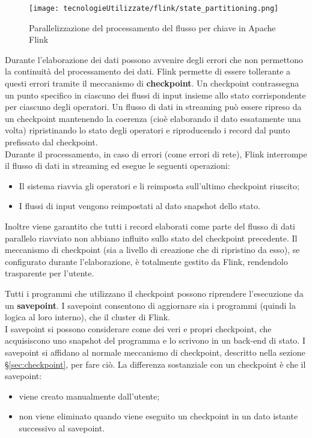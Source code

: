 \begin{figure}[H] 
    \centering 
    \texttt{[image: tecnologieUtilizzate/flink/state\_partitioning.png]} 
    \caption{Parallelizzazione del processamento del flusso per chiave in Apache Flink}
\end{figure}

\label{sec:checkpoint}
Durante l'elaborazione dei dati possono avvenire degli errori che non permettono la continuità del processamento dei dati. Flink permette di essere tollerante a questi errori tramite il meccanismo di \textbf{checkpoint}. Un checkpoint contrassegna un punto specifico in ciascuno dei flussi di input insieme allo stato corrispondente per ciascuno degli operatori. Un flusso di dati in streaming può essere ripreso da un checkpoint mantenendo la coerenza (cioè elaborando il dato essatamente una volta) ripristinando lo stato degli operatori e riproducendo i record dal punto prefissato dal checkpoint.\\
Durante il processamento, in caso di errori (come errori di rete), Flink interrompe il flusso di dati in streaming ed esegue le seguenti operazioni:
\begin{itemize}
	\item{Il sistema riavvia gli operatori e li reimposta sull'ultimo checkpoint riuscito;}
	\item{I flussi di input vengono reimpostati al dato \gls{snapshot} dello stato.}
\end{itemize}
Inoltre viene garantito che tutti i record elaborati come parte del flusso di dati parallelo riavviato non abbiano influito sullo stato del checkpoint precedente.
Il meccanismo di checkpoint (sia a livello di creazione che di ripristino da esso), se configurato durante l'elaborazione, è totalmente gestito da Flink, rendendolo trasparente per l'utente.

Tutti i programmi che utilizzano il checkpoint possono riprendere l'esecuzione da un \textbf{savepoint}. I savepoint  consentono di aggiornare sia i programmi (quindi la logica al loro interno), che il \gls{cluster} di Flink.\\
I savepoint si possono considerare come dei veri e propri checkpoint, che acquisiscono uno \gls{snapshot} del programma e lo scrivono in un back-end di stato. I savepoint si affidano al normale meccanismo di checkpoint, descritto nella sezione \S\ref{sec:checkpoint}, per fare ciò. La differenza sostanziale con un checkpoint è che il savepoint:
\begin{itemize}
	\item{viene creato manualmente dall'utente;}
	\item{non viene eliminato quando viene eseguito un checkpoint in un dato istante successivo al savepoint.}
\end{itemize}


